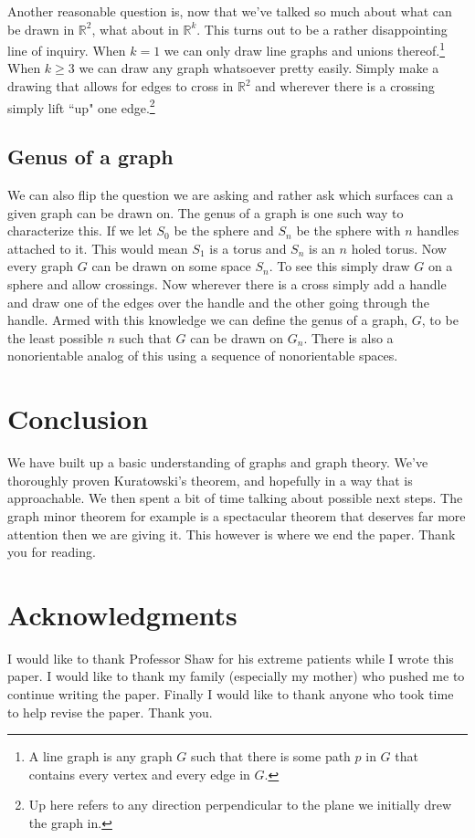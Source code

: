 \documentclass{article}
\begin{document}
Another reasonable question is, now that we've talked so much about what can be drawn in $\mathbb R^2$, what about in $\mathbb R^k$. This turns out to be a rather disappointing line of inquiry. When $k=1$ we can only draw line graphs and unions thereof.\footnote{A line graph is any graph $G$ such that there is some path $p$ in $G$ that contains every vertex and every edge in $G$.} When $k\ge 3$ we can draw any graph whatsoever pretty easily. Simply make a drawing that allows for edges to cross in $\mathbb R^2$ and wherever there is a crossing simply lift ``up" one edge.\footnote{Up here refers to any direction perpendicular to the plane we initially drew the graph in.}


\subsection{Genus of a graph}

We can also flip the question we are asking and rather ask which surfaces can a given graph can be drawn on. The genus of a graph is one such way to characterize this. If we let $S_0$ be the sphere and $S_n$ be the sphere with $n$ handles attached to it. This would mean $S_1$ is a torus and $S_n$ is an $n$ holed torus. Now every graph $G$ can be drawn on some space $S_n$. To see this simply draw $G$ on a sphere and allow crossings. Now wherever there is a cross simply add a handle and draw one of the edges over the handle and the other going through the handle. Armed with this knowledge we can define the genus of a graph, $G$, to be the least possible $n$ such that $G$ can be drawn on $G_n$. There is also a nonorientable analog of this using a sequence of nonorientable spaces.

\section{Conclusion}
We have built up a basic understanding of graphs and graph theory. We've thoroughly proven Kuratowski's theorem, and hopefully in a way that is approachable. We then spent a bit of time talking about possible next steps. The graph minor theorem for example is a spectacular theorem that deserves far more attention then we are giving it. This however is where we end the paper. Thank you for reading. %

\section{Acknowledgments}
I would like to thank Professor Shaw for his extreme patients while I wrote this paper. I would like to thank my family (especially my mother) who pushed me to continue writing the paper. Finally I would like to thank anyone who took time to help revise the paper. Thank you.
\end{document}
